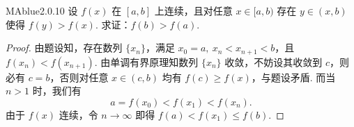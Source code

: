 \begin{problem}{MAblue}{2.0.10}
    设 $f(x)$ 在 $[a, b]$ 上连续，且对任意 $x \in [a, b)$ 存在 $y \in (x, b)$ 使得 $f(y) > f(x)$. 求证：$f(b) > f(a)$.
\end{problem}

\begin{proof}
    由题设知，存在数列 $\{ x_n \}$，满足 $x_0 = a,\ x_n < x_{n+1} < b$，且 $f(x_n) < f(x_{n+1})$. 由单调有界原理知数列 $\{ x_n \}$ 收敛，不妨设其收敛到 $c$，则必有 $c = b$，否则对任意 $x \in (c, b)$ 均有 $f(c) \geqslant f(x)$，与题设矛盾. 而当 $n > 1$ 时，我们有
    \[
        a = f(x_0) < f(x_1) < f(x_n).
    \]
    由于 $f(x)$ 连续，令 $n \to \infty$ 即得 $f(a) < f(x_1) \leqslant f(b)$.
\end{proof}